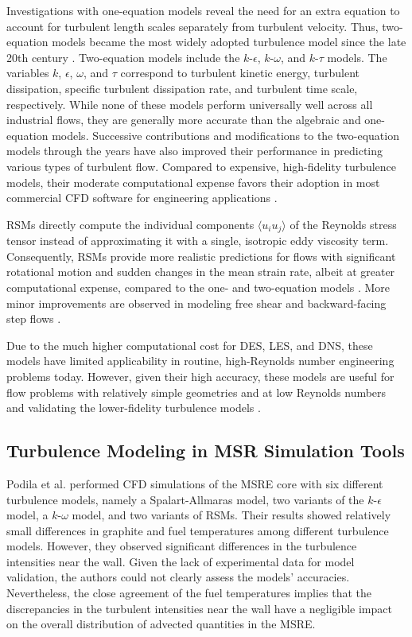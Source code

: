 Investigations with
one-equation models reveal the need for an extra equation to account for
turbulent length scales separately from turbulent velocity. Thus, two-equation
models became the most widely adopted turbulence model since the late 20th century
\cite{pope_turbulent_2000}. Two-equation models include the $k$-$\epsilon$,
$k$-$\omega$, and $k$-$\tau$ models. The variables $k$, $\epsilon$, $\omega$,
and $\tau$ correspond to turbulent kinetic energy, turbulent dissipation,
specific turbulent dissipation rate, and turbulent time scale, respectively.
While none of these models perform universally well across all
industrial flows, they are generally more
accurate than the algebraic and one-equation models. Successive contributions
and modifications to the two-equation models through the years have also
improved their performance in predicting various types of turbulent flow. Compared to expensive,
high-fidelity turbulence models, their moderate computational expense favors their adoption in most
commercial \gls{CFD} software for
engineering applications \cite{pope_turbulent_2000}.

\glspl{RSM} directly compute the individual components $\langle u_i u_j
\rangle$ of the Reynolds stress tensor instead of approximating it with a
single, isotropic eddy viscosity term. Consequently, \glspl{RSM} provide
more realistic predictions for flows with significant rotational motion and
sudden changes in the mean strain rate, albeit at greater computational
expense, compared to the one- and two-equation models
\cite{wilcox_turbulence_2006}. More minor improvements are observed in modeling
free shear and backward-facing step flows \cite{wilcox_turbulence_2006}.

Due to the much higher computational cost for \gls{DES}, \gls{LES}, and
\gls{DNS}, these models have limited applicability in routine, high-Reynolds
number engineering problems today. However, given their high accuracy, these
models are useful for flow problems with relatively simple geometries and at
low Reynolds numbers and validating the lower-fidelity turbulence models
\cite{zhiyin_large-eddy_2015}.

\subsection{Turbulence Modeling in MSR Simulation Tools}

Podila et al. \cite{podila_cfd_2019} performed \gls{CFD} simulations of the
\gls{MSRE} core with six different turbulence models, namely a Spalart-Allmaras
model, two variants of the $k$-$\epsilon$ model, a $k$-$\omega$ model, and two
variants of \glspl{RSM}. Their results showed relatively small differences
in graphite and fuel temperatures among different turbulence models. However,
they observed significant differences in the turbulence intensities near the
wall. Given the lack of experimental data for model validation, the authors
could not clearly assess the models' accuracies. Nevertheless, the
close agreement of the fuel temperatures implies that the discrepancies in the
turbulent intensities near the wall have a negligible impact on the overall
distribution of advected quantities in the \gls{MSRE}.


